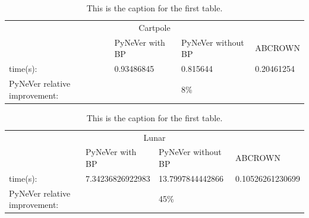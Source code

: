 \begin{table}[]
    \centering
    \begin{tabular}{@{}llll@{}}
        \toprule
        \multicolumn{4}{c}{Cartpole}  \\
        \cmidrule(r){1-4}
                                            & PyNeVer with BP                        & PyNeVer without BP               & ABCROWN                           \\ \cmidrule(r){1-4}
    time(s):                                & {\color[HTML]{ACB9CA} 0.93486845}      & {\color[HTML]{ACB9CA} 0.815644} & {\color[HTML]{ACB9CA} 0.20461254}  \\ \cmidrule(r){1-4}
    PyNeVer relative improvement:           &                                        & {\color[HTML]{FF0000} 8\%}       &                                   \\ \cmidrule(r){1-4}
    \end{tabular}
    \caption{This is the caption for the first table.}
    \label{table:CARTPOLE}
\end{table}


\begin{table}[]
    \centering
    \begin{tabular}{@{}llll@{}}
        \toprule
        \multicolumn{4}{c}{Lunar}  \\
        \cmidrule(r){1-4}
                                             & PyNeVer with BP & PyNeVer without BP                & ABCROWN                           \\ \cmidrule(r){1-4}
    time(s):                                 & {\color[HTML]{ACB9CA} 7.34236826922983}                   & {\color[HTML]{ACB9CA} 13.7997844442866}  & {\color[HTML]{ACB9CA} 0.10526261230699} \\ \cmidrule(r){1-4}
    PyNeVer relative improvement:            &                                                     & {\color[HTML]{FF0000} 45\%}       &                                   \\ \cmidrule(r){1-4}
    \end{tabular}
    \caption{This is the caption for the first table.}
    \label{table:LUNAR}
\end{table}



